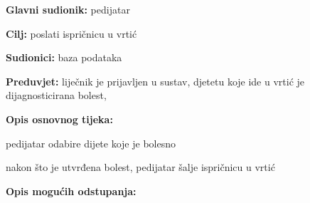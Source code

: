                     \noindent {}
					\begin{packed_item}
	
						\item \textbf{Glavni sudionik: }pedijatar
						\item  \textbf{Cilj:} poslati ispričnicu u vrtić
						\item  \textbf{Sudionici:} baza podataka
						\item  \textbf{Preduvjet:} liječnik je prijavljen u sustav, djetetu koje ide u vrtić je dijagnosticirana bolest, 
						\item  \textbf{Opis osnovnog tijeka:}
						
						\item[] \begin{packed_enum}
	
							\item pedijatar odabire dijete koje je bolesno
							\item nakon što je utvrđena bolest, pedijatar šalje ispričnicu u vrtić
							\item 

						\end{packed_enum}
						
						\item  \textbf{Opis mogućih odstupanja:}
						
						\item[] \begin{packed_item}
	
							\item[2.a] 
							\item[] \begin{packed_enum}
								
								\item 
								\item 
							\end{packed_enum}
							
						\end{packed_item}
					\end{packed_item}

